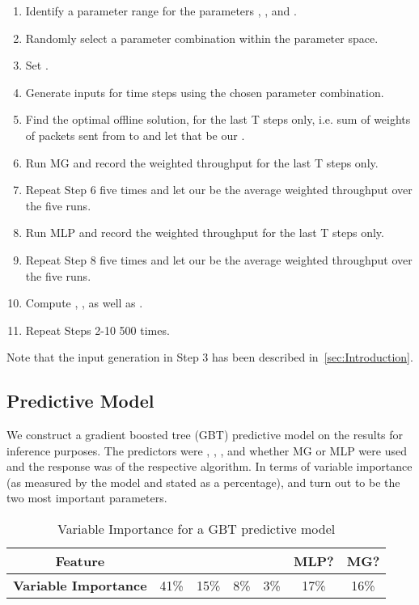\documentclass[oribibl]{llncs}
\begin{document}
\begin {enumerate}
\item Identify a parameter range for the parameters , ,  and .
\item Randomly select a parameter combination within the parameter space. 
\item Set . 
\item Generate inputs for  time steps using the chosen parameter combination.
\item Find the optimal offline solution, for the last T steps only, i.e. sum of weights of packets sent from  to  and let that be our .

\item Run MG and record the weighted throughput for the last T steps only.
\item Repeat Step 6 five times and let our  be the average weighted throughput over the five runs.

\item Run MLP and record the weighted throughput for the last T steps only.
\item Repeat Step 8 five times and let our  be the average weighted throughput over the five runs.

\item Compute , , as well as .
\item Repeat Steps 2-10 500 times.
\end{enumerate}

Note that the input generation in Step 3 has been described in~\ref{sec:Introduction}.


\subsection{Predictive Model}
\label{app:predM}
We construct a gradient boosted tree (GBT) predictive model on the results for inference purposes. The predictors were , , ,  and whether MG or MLP were used and the response was  of the respective algorithm. In terms of variable importance (as measured by the model and stated as a percentage),  and  turn out to be the two most important parameters.

\vspace{-13pt}
\begin{table}
\centering
 \begin{tabular}{|c || c c c c | c c|} 
 \hline
 \textbf{Feature} &  &  &   &  & \textbf{MLP?} & \textbf{MG?} \\
 \hline
 \textbf{Variable Importance}& 41\%  & 15\% & 8\%& 3\% & 17\% & 16\%\\  
  \hline

\end{tabular}
 \caption{Variable Importance for a GBT predictive model}
\end{table}
\end{document}
